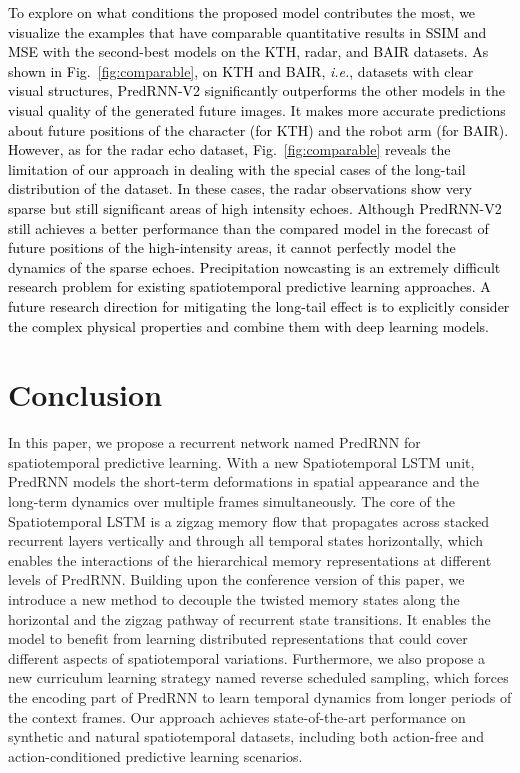 \documentclass[10pt,journal,compsoc]{IEEEtran}
\newcommand{\fig}[1]{Fig.~\ref{#1}}
\newcommand{\revise}[1]{{\textcolor{black}{#1}}}
\begin{document}
\revise{
To explore on what conditions the proposed model contributes the most, we visualize the examples that have comparable quantitative results in SSIM and MSE with the second-best models on the KTH, radar, and BAIR datasets.
As shown in \fig{fig:comparable}, on KTH and BAIR, \textit{i.e.}, datasets with clear visual structures, PredRNN-V2 significantly outperforms the other models in the visual quality of the generated future images. It makes more accurate predictions about future positions of the character (for KTH) and the robot arm (for BAIR).
However, as for the radar echo dataset, \fig{fig:comparable} reveals the limitation of our approach in dealing with the special cases of the long-tail distribution of the dataset. In these cases, the radar observations show very sparse but still significant areas of high intensity echoes.
Although PredRNN-V2 still achieves a better performance than the compared model in the forecast of future positions of the high-intensity areas, it cannot perfectly model the dynamics of the sparse echoes.
Precipitation nowcasting is an extremely difficult research problem for existing spatiotemporal predictive learning approaches.
A future research direction for mitigating the long-tail effect is to explicitly consider the complex physical properties and combine them with deep learning models.
}






\section{Conclusion}

In this paper, we propose a recurrent network named PredRNN for spatiotemporal predictive learning. 
With a new Spatiotemporal LSTM unit, PredRNN models the short-term deformations in spatial appearance and the long-term dynamics over multiple frames simultaneously.
The core of the Spatiotemporal LSTM is a zigzag memory flow that propagates across stacked recurrent layers vertically and through all temporal states horizontally, which enables the interactions of the hierarchical memory representations at different levels of PredRNN. 
Building upon the conference version of this paper, we introduce a new method to decouple the twisted memory states along the horizontal and the zigzag pathway of recurrent state transitions. It enables the model to benefit from learning distributed representations that could cover different aspects of spatiotemporal variations.
Furthermore, we also propose a new curriculum learning strategy named reverse scheduled sampling, which forces the encoding part of PredRNN to learn temporal dynamics from longer periods of the context frames. 
Our approach achieves state-of-the-art performance on synthetic and natural spatiotemporal datasets, including both action-free and action-conditioned predictive learning scenarios.
\end{document}
